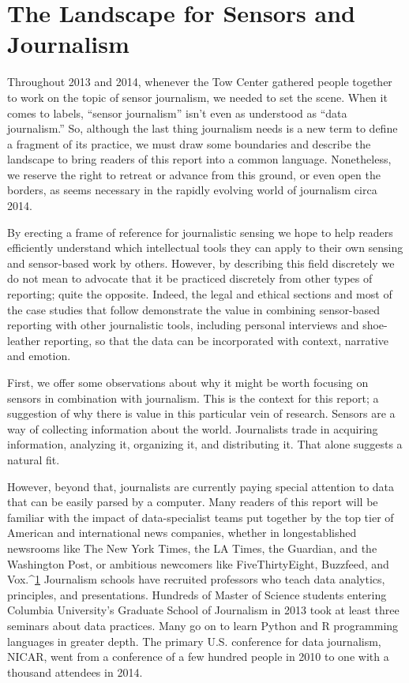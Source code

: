 \chapter{The Landscape for Sensors and Journalism}
Throughout 2013 and 2014, whenever the Tow Center gathered people
together to work on the topic of sensor journalism, we needed to set the
scene. When it comes to labels, ``sensor journalism'' isn't even as understood
as ``data journalism.'' So, although the last thing journalism needs is a new
term to define a fragment of its practice, we must draw some boundaries
and describe the landscape to bring readers of this report into a common
language. Nonetheless, we reserve the right to retreat or advance from this
ground, or even open the borders, as seems necessary in the rapidly evolving
world of journalism circa 2014.

By erecting a frame of reference for journalistic sensing we hope to help
readers efficiently understand which intellectual tools they can apply to
their own sensing and sensor-based work by others. However, by describing
this field discretely we do not mean to advocate that it be practiced discretely
from other types of reporting; quite the opposite. Indeed, the legal
and ethical sections and most of the case studies that follow demonstrate
the value in combining sensor-based reporting with other journalistic tools,
including personal interviews and shoe-leather reporting, so that the data
can be incorporated with context, narrative and emotion.

First, we offer some observations about why it might be worth focusing on
sensors in combination with journalism. This is the context for this report;
a suggestion of why there is value in this particular vein of research.
Sensors are a way of collecting information about the world. Journalists
trade in acquiring information, analyzing it, organizing it, and distributing
it. That alone suggests a natural fit.

However, beyond that, journalists are currently paying special attention to
data that can be easily parsed by a computer. Many readers of this report
will be familiar with the impact of data-specialist teams put together by the
top tier of American and international news companies, whether in longestablished
newsrooms like The New York Times, the LA Times, the Guardian,
and the Washington Post, or ambitious newcomers like FiveThirtyEight,
Buzzfeed, and Vox.^{\href{#endnotes-landscape}{1}} Journalism schools have recruited professors who teach
data analytics, principles, and presentations. Hundreds of Master of Science
students entering Columbia University's Graduate School of Journalism
in 2013 took at least three seminars about data practices. Many go on to
learn Python and R programming languages in greater depth. The primary
U.S. conference for data journalism, NICAR, went from a conference of a
few hundred people in 2010 to one with a thousand attendees
in 2014.

